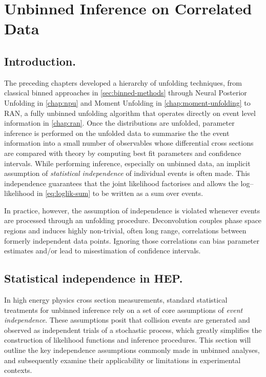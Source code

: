 \chapter{Unbinned Inference on Correlated Data}
\label{chap:unbinned_correlations}
\section{Introduction.}
    The preceding chapters developed a hierarchy of unfolding techniques, from classical binned approaches in \cref{sec:binned-methods} through Neural Posterior Unfolding in \cref{chap:npu} and Moment Unfolding in \cref{chap:moment-unfolding} to RAN, a fully unbinned unfolding algorithm that operates directly on event level information in \cref{chap:ran}.
    Once the distributions are unfolded, parameter inference is performed on the unfolded data to summarise the the event information into a small number of observables whose differential cross sections are compared with theory by computing best fit parameters and confidence intervals.
    While performing inference, especially on unbinned data, an implicit assumption of \emph{statistical independence} of individual events is often made.
    This independence guarantees that the joint likelihood factorises and allows the log--likelihood in \cref{eq:loglik-sum} to be written as a sum over events.
    
    In practice, however, the assumption of independence is violated whenever events are processed through an unfolding procedure.
    Deconvolution couples phase space regions and induces highly non-trivial, often long range, correlations between formerly independent data points.
    Ignoring those correlations can bias parameter estimates and/or lead to misestimation of confidence intervals.
\section{Statistical independence in HEP.}
\label{sec:independence-assumptions}
    In high energy physics cross section measurements, standard statistical treatments for unbinned inference rely on a set of core assumptions of \emph{event independence}. 
    These assumptions posit that collision events are generated and observed as independent trials of a stochastic process, which greatly simplifies the construction of likelihood functions and inference procedures.
    This section will outline the key independence assumptions commonly made in unbinned analyses, and subsequently examine their applicability or limitations in experimental contexts.
